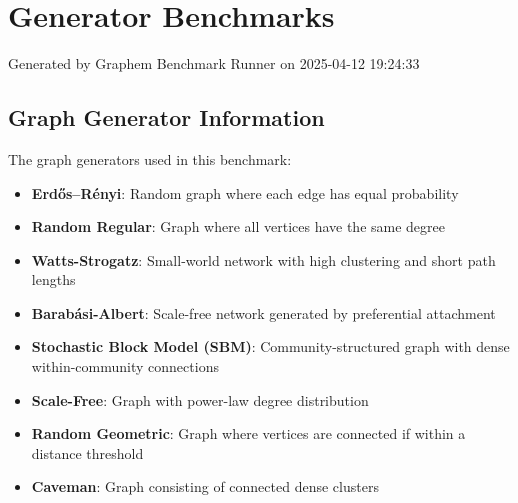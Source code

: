 \documentclass{article}
\begin{document}
\section*{Generator Benchmarks}
Generated by Graphem Benchmark Runner on 2025-04-12 19:24:33
\subsection*{Graph Generator Information}
The graph generators used in this benchmark:
\begin{itemize}
\item \textbf{Erdős–Rényi}: Random graph where each edge has equal probability
\item \textbf{Random Regular}: Graph where all vertices have the same degree
\item \textbf{Watts-Strogatz}: Small-world network with high clustering and short path lengths
\item \textbf{Barabási-Albert}: Scale-free network generated by preferential attachment
\item \textbf{Stochastic Block Model (SBM)}: Community-structured graph with dense within-community connections
\item \textbf{Scale-Free}: Graph with power-law degree distribution
\item \textbf{Random Geometric}: Graph where vertices are connected if within a distance threshold
\item \textbf{Caveman}: Graph consisting of connected dense clusters
\end{itemize}
\end{document}
